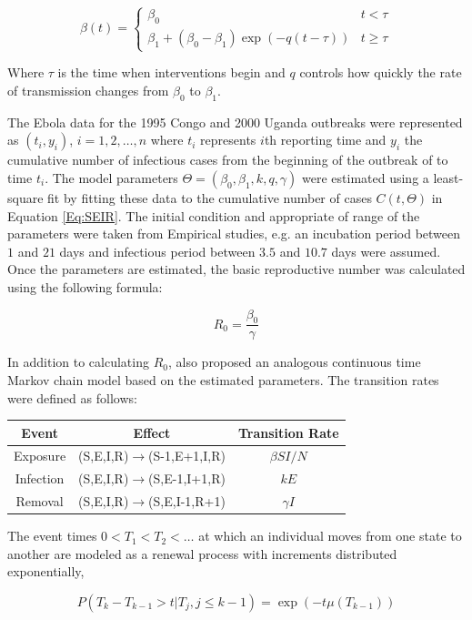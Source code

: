 \documentclass[10pt, journal,onecolumn]{IEEEtran}
\begin{document}
\[
\beta(t)=\begin{cases}
\beta_{0} & t<\tau\\
\beta_{1}+(\beta_{0}-\beta_{1})\exp\left(-q\left(t-\tau\right)\right) & t\ge\tau
\end{cases}
\]

Where $\tau$ is the time when interventions begin and $q$ controls how quickly the rate
of transmission changes from $\beta_0$ to $\beta_1$.

The Ebola data for the 1995 Congo and 2000 Uganda outbreaks were represented as $(t_i,y_i)$,
$i=1,2,\ldots,n$ where $t_i$ represents $i$th reporting time and $y_i$ the cumulative number of
infectious cases from the beginning of the outbreak of to time $t_i$.  The model parameters
$\Theta=(\beta_0,\beta_1,k,q,\gamma)$ were estimated using a least-square fit by fitting these data to
the cumulative number of cases $C(t,\Theta)$ in Equation \ref{Eq:SEIR}. The initial condition and
appropriate of range of the parameters were taken from Empirical studies, e.g. an incubation period
between $1$ and $21$ days and infectious period between $3.5$ and $10.7$ days were assumed. Once the
parameters are estimated, the basic reproductive number was calculated using the following formula:

\begin{equation}
R_0 = \dfrac{\beta_0}{\gamma}
\end{equation}


In addition to calculating $R_0$, \citep{chowell2004basic} also proposed an analogous continuous time Markov chain model based on the estimated parameters. The transition rates were defined as follows:

\begin{center}
\begin{tabular}{|c|c|c|}
\hline
Event & Effect & Transition Rate\tabularnewline
\hline
\hline
Exposure & (S,E,I,R)$\to$(S-1,E+1,I,R) & $\beta SI/N$\tabularnewline
\hline
Infection & (S,E,I,R)$\to$(S,E-1,I+1,R) & $kE$\tabularnewline
\hline
Removal & (S,E,I,R)$\to$(S,E,I-1,R+1) & $\gamma I$\tabularnewline
\hline
\end{tabular}
\end{center}

The event times $0<T_1<T_2<\ldots$ at which an individual moves from one state to another are modeled as a renewal process with increments distributed exponentially,

\begin{equation}
P(T_k-T_{k-1} > t | T_j, j\leq k-1) = \exp(-t \mu (T_{k-1}) )
\end{equation}
\end{document}
